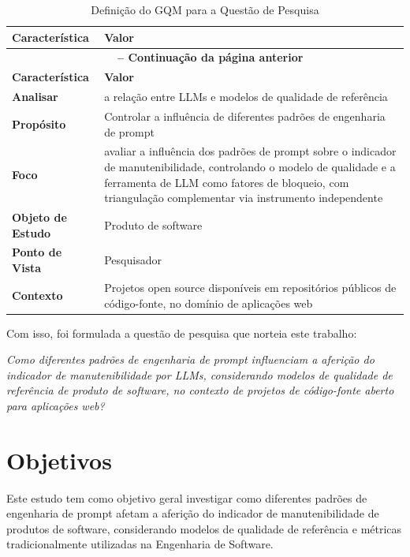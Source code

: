 \begin{longtable}{p{4cm}p{11cm}}
    \caption{Definição do GQM para a Questão de Pesquisa} \label{tab:gqm} \\
    \toprule
    \textbf{Característica} & \textbf{Valor} \\
    \midrule
    \endfirsthead
    \multicolumn{2}{c}{{\bfseries \tablename\ \thetable{} -- Continuação da página anterior}} \\
    \toprule
    \textbf{Característica} & \textbf{Valor} \\
    \midrule
    \endhead
    \bottomrule
    \endfoot
    \bottomrule
    \endlastfoot
    \textbf{Analisar} & a relação entre LLMs e modelos de qualidade de referência \\
    \midrule
    \textbf{Propósito} & Controlar a influência de diferentes padrões de engenharia de prompt \\
    \midrule
    \textbf{Foco} & avaliar a influência dos padrões de prompt sobre o indicador de manutenibilidade, controlando o modelo de qualidade e a ferramenta de LLM como fatores de bloqueio, com triangulação complementar via instrumento independente \\
    \midrule
    \textbf{Objeto de Estudo} & Produto de software \\
    \midrule
    \textbf{Ponto de Vista} & Pesquisador \\
    \midrule
    \textbf{Contexto} & Projetos open source disponíveis em repositórios públicos de código-fonte, no domínio de aplicações web \\
\end{longtable}

Com isso, foi formulada a questão de pesquisa que norteia este trabalho: 

\textit{Como diferentes padrões de engenharia de prompt influenciam a aferição do indicador de manutenibilidade por LLMs, considerando modelos de qualidade de referência de produto de software, no contexto de projetos de código-fonte aberto para aplicações web?}



\section{Objetivos}

Este estudo tem como objetivo geral investigar como diferentes padrões de engenharia de prompt afetam a aferição do indicador de manutenibilidade de produtos de software, considerando modelos de qualidade de referência e métricas tradicionalmente utilizadas na Engenharia de Software.

